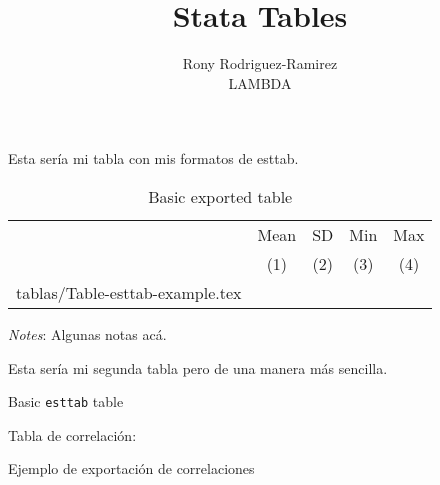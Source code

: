 \documentclass{article}
\makeatletter
\newcommand\primitiveinput[1]
{\@@input #1 }
\makeatother
\begin{document}
\title{Stata Tables}
\author{Rony Rodriguez-Ramirez \\ LAMBDA}
\maketitle
\listoftables
\newpage
Esta sería mi tabla con mis formatos de esttab.

\begin{table}[H]
	\centering
	\label{tab:Table}
	\begin{adjustbox}{max width=\linewidth}
		\begin{threeparttable}
			\caption{Basic exported table}
			\begin{tabular}{@{}l*{4}{c}@{}}
        \toprule
        \toprule 
        & Mean & SD & Min & Max \\
				& (1) & (2) & (3) & (4) \\
				\primitiveinput{tablas/Table-esttab-example.tex}
				\bottomrule
			\end{tabular}
			\begin{tablenotes}
				\setlength{}
				\footnotesize
				\item \textit{Notes}: Algunas notas acá.
			\end{tablenotes}
		\end{threeparttable}
	\end{adjustbox}
\end{table}

Esta sería mi segunda tabla pero de una manera más sencilla.

\begin{table}[H]
  \centering
	\caption{Basic \texttt{esttab} table}
	\begin{adjustbox}{max width = \textwidth}
		
	\end{adjustbox}
\end{table}

Tabla de correlación:

\begin{table}[H]
  \centering
  \caption{Ejemplo de exportación de correlaciones}
  \begin{adjustbox}{max width = \textwidth}
    
  \end{adjustbox}
\end{table}
\end{document}
